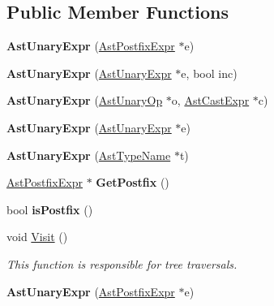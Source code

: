 \subsection*{Public Member Functions}
\begin{DoxyCompactItemize}
\item 
\hypertarget{classAstUnaryExpr_a7afc6e7c4cf309676aa701656c70453a}{{\bfseries Ast\-Unary\-Expr} (\hyperlink{classAstPostfixExpr}{Ast\-Postfix\-Expr} $\ast$e)}\label{classAstUnaryExpr_a7afc6e7c4cf309676aa701656c70453a}

\item 
\hypertarget{classAstUnaryExpr_a82859566c71d787e29263ff3ba013261}{{\bfseries Ast\-Unary\-Expr} (\hyperlink{classAstUnaryExpr}{Ast\-Unary\-Expr} $\ast$e, bool inc)}\label{classAstUnaryExpr_a82859566c71d787e29263ff3ba013261}

\item 
\hypertarget{classAstUnaryExpr_ad71de2cd2c65b31e5f5f5fde4e75fc14}{{\bfseries Ast\-Unary\-Expr} (\hyperlink{classAstUnaryOp}{Ast\-Unary\-Op} $\ast$o, \hyperlink{classAstCastExpr}{Ast\-Cast\-Expr} $\ast$c)}\label{classAstUnaryExpr_ad71de2cd2c65b31e5f5f5fde4e75fc14}

\item 
\hypertarget{classAstUnaryExpr_a22b7c004d42c54c96b40de10cc90a07e}{{\bfseries Ast\-Unary\-Expr} (\hyperlink{classAstUnaryExpr}{Ast\-Unary\-Expr} $\ast$e)}\label{classAstUnaryExpr_a22b7c004d42c54c96b40de10cc90a07e}

\item 
\hypertarget{classAstUnaryExpr_a305b745cf1449c3d3dc4e74dcd768ef1}{{\bfseries Ast\-Unary\-Expr} (\hyperlink{classAstTypeName}{Ast\-Type\-Name} $\ast$t)}\label{classAstUnaryExpr_a305b745cf1449c3d3dc4e74dcd768ef1}

\item 
\hypertarget{classAstUnaryExpr_a0892bfd110770a877a6c654875beae05}{\hyperlink{classAstPostfixExpr}{Ast\-Postfix\-Expr} $\ast$ {\bfseries Get\-Postfix} ()}\label{classAstUnaryExpr_a0892bfd110770a877a6c654875beae05}

\item 
\hypertarget{classAstUnaryExpr_a8adfdc9b288dcb86e7ed6854601eef28}{bool {\bfseries is\-Postfix} ()}\label{classAstUnaryExpr_a8adfdc9b288dcb86e7ed6854601eef28}

\item 
void \hyperlink{classAstUnaryExpr_ae35427088d6f5c889e8e80573a3750fc}{Visit} ()
\begin{DoxyCompactList}\small\item\em This function is responsible for tree traversals. \end{DoxyCompactList}\item 
\hypertarget{classAstUnaryExpr_a7afc6e7c4cf309676aa701656c70453a}{{\bfseries Ast\-Unary\-Expr} (\hyperlink{classAstPostfixExpr}{Ast\-Postfix\-Expr} $\ast$e)}\label{classAstUnaryExpr_a7afc6e7c4cf309676aa701656c70453a}


\end{DoxyCompactItemize}
